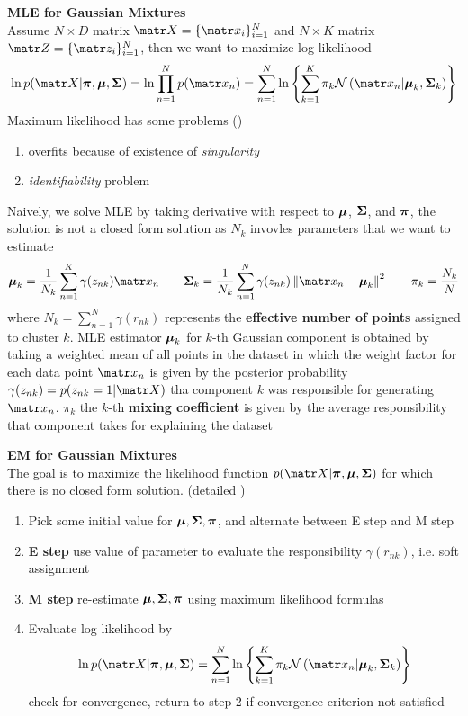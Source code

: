 \documentclass[11pt]{article}
\begin{document}
\begin{defn*}
    \textbf{MLE for Gaussian Mixtures} \\
    Assume $N\times D$ matrix $\bX = \{\bx_i\}_{i=1}^N$ and $N\times K$ matrix $\bZ = \{ \bz_i \}_{i=1}^N$, then we want to maximize log likelihood
    \[
        \ln p(\bX | \bpi, \bmu, \bSigma) 
        = \ln \prod_{n=1}^N p(\bx_n)
        = \sum_{n=1}^N \ln \left\{ 
            \sum_{k=1}^K \pi_k \normal{\bx_n | \bmu_k, \bSigma_k}
             \right\}
    \]
    Maximum likelihood has some problems ()
    \begin{enumerate}
        \item overfits because of existence of \textit
        {singularity}
        \item \textit{identifiability} problem
    \end{enumerate}
    Naively, we solve MLE by taking derivative with respect to $\boldsymbol{\mu}$, $\boldsymbol{\Sigma}$, and $\boldsymbol{\pi}$, the solution is not a closed form solution as $N_k$ invovles parameters that we want to estimate
    \[
        \bmu_k = \frac{1}{N_k} \sum_{n=1}^K \gamma(z_{nk}) \bx_n
        \qquad 
        \bSigma_k = \frac{1}{N_k}\sum_{n=1}^N \gamma(z_{nk}) \norm{\bx_n - \bmu_k}^2
        \qquad 
        \pi_k = \frac{N_k}{N}
    \]
    where $N_k = \textstyle \sum_{n=1}^N \gamma(r_{nk})$ represents the \textbf{ effective number of points} assigned to cluster $k$. MLE estimator $\boldsymbol{\mu}_k$ for $k$-th Gaussian component is obtained by taking a weighted mean of all points in the dataset in which the weight factor for each data point $\bx_n$ is given by the posterior probability $\gamma(z_{nk}) = p(z_{nk}=1|\bX)$ tha component $k$ was responsible for generating $\bx_n$. $\pi_k$ the $k$-th \textbf{mixing coefficient} is given by the average responsibility that component takes for explaining the dataset
\end{defn*}  

\begin{defn*}
    \textbf{EM for Gaussian Mixtures} \\
    The goal is to maximize the likelihood function $p(\bX | \bpi, \bmu, \bSigma)$ for which there is no closed form solution. (detailed )
    \begin{enumerate}
        \item Pick some initial value for $\boldsymbol{\mu}, \boldsymbol{\Sigma}, \boldsymbol{\pi}$, and alternate between E step and M step
        \item \textbf{E step} use value of parameter to evaluate the responsibility $\gamma(r_{nk})$, i.e. soft assignment
        \item \textbf{M step} re-estimate $\boldsymbol{\mu}, \boldsymbol{\Sigma}, \boldsymbol{\pi}$ using maximum likelihood formulas
        \item Evaluate log likelihood by 
        \[
            \ln p(\bX | \bpi, \bmu, \bSigma)
            = \sum_{n=1}^N \ln \left\{ 
                \sum_{k=1}^K \pi_k \normal{\bx_n | \bmu_k, \bSigma_k}
                 \right\}
        \]
        check for convergence, return to step 2 if convergence criterion not satisfied
    \end{enumerate}
\end{defn*}
\end{document}
